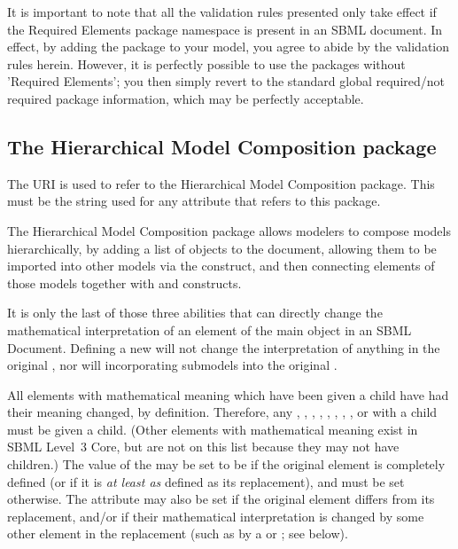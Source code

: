 It is important to note that all the validation rules presented only take effect if the Required Elements package namespace is present in an SBML document.  In effect, by adding the package to your model, you agree to abide by the validation rules herein.  However, it is perfectly possible to use the packages without 'Required Elements'; you then simply revert to the standard global required/not required package information, which may be perfectly acceptable.


\subsection{The Hierarchical Model Composition package}

The URI  is used to refer to the Hierarchical Model Composition package.  This must be the string used for any  attribute that refers to this package.

The Hierarchical Model Composition package allows modelers to compose models hierarchically, by adding a list of \Model objects to the document, allowing them to be imported into other models via the \Submodel construct, and then connecting elements of those models together with \ReplacedElement and \ReplacedBy constructs.

It is only the last of those three abilities that can directly change the mathematical interpretation of an element of the main \Model object in an SBML Document.  Defining a new \Model will not change the interpretation of anything in the original \Model, nor will incorporating submodels into the original \Model.

All elements with mathematical meaning which have been given a \ReplacedBy child have had their meaning changed, by definition.  Therefore, any \Compartment, \Parameter, \Reaction, \Species, \Constraint, \Event, \FunctionDefinition, \InitialAssignment, or \Rule with a \ReplacedBy child must be given a \ChangedMath child.  (Other elements with mathematical meaning exist in SBML Level~3 Core, but are not on this list because they may not have \ReplacedBy children.)  The value of the  may be set to be  if the original element is completely defined (or if it is \emph{at least as} defined as its replacement), and must be set  otherwise.  The attribute may also be set  if the original element differs from its replacement, and/or if their mathematical interpretation is changed by some other element in the replacement (such as by a \Rule or \Reaction; see below).

